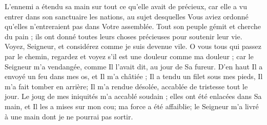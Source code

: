 L'ennemi a étendu sa main sur tout ce qu'elle avait de précieux, car elle a vu entrer dans son sanctuaire les nations, au sujet desquelles Vous aviez ordonné qu'elles n'entreraient pas dans Votre assemblée.
Tout son peuple gémit et cherche du pain ; ils ont donné toutes leurs choses précieuses pour soutenir leur vie. Voyez, Seigneur, et considérez comme je suis devenue vile.
O vous tous qui passez par le chemin, regardez et voyez s'il est une douleur comme ma douleur ; car le Seigneur m'a vendangée, comme Il l'avait dit, au jour de Sa fureur.
D'en haut Il a envoyé un feu dans mes os, et Il m'a châtiée ; Il a tendu un filet sous mes pieds, Il m'a fait tomber en arrière; Il m'a rendue désolée, accablée de tristesse tout le jour.
Le joug de mes iniquités m'a accablé soudain ; elles ont été enlacées dans Sa main, et Il les a mises sur mon cou; ma force a été affaiblie; le Seigneur m'a livré à une main dont je ne pourrai pas sortir.